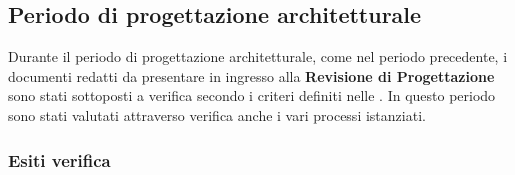 \subsection{Periodo di progettazione architetturale} \label{ResocontoPArchitetturale}
Durante il periodo di progettazione architetturale, come nel periodo precedente, i documenti redatti da presentare in ingresso alla \textbf{Revisione di Progettazione} sono stati sottoposti a verifica secondo i criteri definiti nelle . In questo periodo sono stati valutati attraverso verifica anche i vari processi istanziati.
\subsubsection{Esiti verifica}

